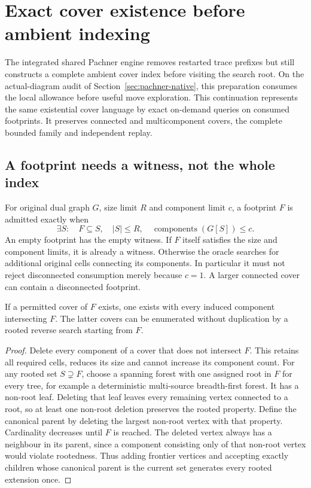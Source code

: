 \section{Exact cover existence before ambient indexing}
\label{sec:cover-oracle}

The integrated shared Pachner engine removes restarted trace prefixes but
still constructs a complete ambient cover index before visiting the search
root. On the actual-diagram audit of Section~\ref{sec:pachner-native}, this
preparation consumes the local allowance before useful move exploration.
This continuation represents the same existential cover language by exact
on-demand queries on consumed footprints. It preserves connected and
multicomponent covers, the complete bounded family and independent replay.

\subsection{A footprint needs a witness, not the whole index}

For original dual graph $G$, size limit $R$ and component limit $c$, a
footprint $F$ is admitted exactly when
\[
  \exists S:\quad F\subseteq S,\quad |S|\le R,\quad
                          \operatorname{components}(G[S])\le c.
\]
An empty footprint has the empty witness. If $F$ itself satisfies the size
and component limits, it is already a witness. Otherwise the oracle searches
for additional original cells connecting its components. In particular it
must not reject disconnected consumption merely because $c=1$.
A larger connected cover can contain a disconnected footprint.

\begin{proposition}
If a permitted cover of $F$ exists, one exists with every induced component
intersecting $F$. The latter covers can be enumerated without duplication
by a rooted reverse search starting from $F$.
\end{proposition}
\begin{proof}
Delete every component of a cover that does not intersect $F$. This retains
all required cells, reduces its size and cannot increase its component
count. For any rooted set $S\supsetneq F$, choose a spanning forest with
one assigned root in $F$ for every tree, for example a deterministic
multi-source breadth-first forest. It has a non-root leaf. Deleting that
leaf leaves every remaining vertex connected to a root, so at least one
non-root deletion preserves the rooted property.
Define the canonical parent by deleting the largest non-root vertex with
that property. Cardinality decreases until $F$ is reached. The deleted
vertex always has a neighbour in its parent, since a component consisting
only of that non-root vertex would violate rootedness. Thus adding frontier
vertices and accepting exactly children whose canonical parent is the
current set generates every rooted extension once.
\end{proof}

